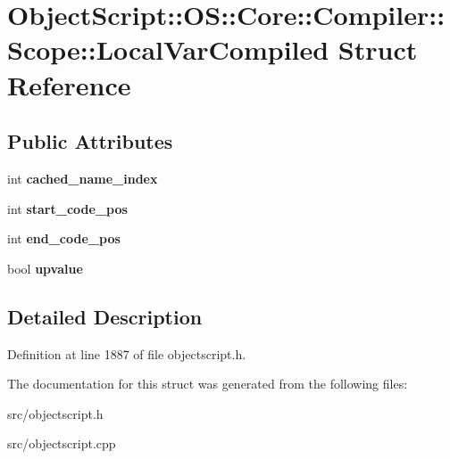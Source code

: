 \hypertarget{struct_object_script_1_1_o_s_1_1_core_1_1_compiler_1_1_scope_1_1_local_var_compiled}{}\section{Object\+Script\+:\+:OS\+:\+:Core\+:\+:Compiler\+:\+:Scope\+:\+:Local\+Var\+Compiled Struct Reference}
\label{struct_object_script_1_1_o_s_1_1_core_1_1_compiler_1_1_scope_1_1_local_var_compiled}
\subsection*{Public Attributes}
\begin{DoxyCompactItemize}
\item 
int {\bfseries cached\+\_\+name\+\_\+index}\hypertarget{struct_object_script_1_1_o_s_1_1_core_1_1_compiler_1_1_scope_1_1_local_var_compiled_a569f0c451b95c8372b592209cb24f324}{}\label{struct_object_script_1_1_o_s_1_1_core_1_1_compiler_1_1_scope_1_1_local_var_compiled_a569f0c451b95c8372b592209cb24f324}

\item 
int {\bfseries start\+\_\+code\+\_\+pos}\hypertarget{struct_object_script_1_1_o_s_1_1_core_1_1_compiler_1_1_scope_1_1_local_var_compiled_a8b0c1aa6f7e1dc0ce464165b624a2fdc}{}\label{struct_object_script_1_1_o_s_1_1_core_1_1_compiler_1_1_scope_1_1_local_var_compiled_a8b0c1aa6f7e1dc0ce464165b624a2fdc}

\item 
int {\bfseries end\+\_\+code\+\_\+pos}\hypertarget{struct_object_script_1_1_o_s_1_1_core_1_1_compiler_1_1_scope_1_1_local_var_compiled_a29ab8413c2e1398f4959800eb45ef950}{}\label{struct_object_script_1_1_o_s_1_1_core_1_1_compiler_1_1_scope_1_1_local_var_compiled_a29ab8413c2e1398f4959800eb45ef950}

\item 
bool {\bfseries upvalue}\hypertarget{struct_object_script_1_1_o_s_1_1_core_1_1_compiler_1_1_scope_1_1_local_var_compiled_a65040a5f77de3121d6d6a88eee124e10}{}\label{struct_object_script_1_1_o_s_1_1_core_1_1_compiler_1_1_scope_1_1_local_var_compiled_a65040a5f77de3121d6d6a88eee124e10}

\end{DoxyCompactItemize}


\subsection{Detailed Description}


Definition at line 1887 of file objectscript.\+h.



The documentation for this struct was generated from the following files\+:\begin{DoxyCompactItemize}
\item 
src/objectscript.\+h\item 
src/objectscript.\+cpp\end{DoxyCompactItemize}
